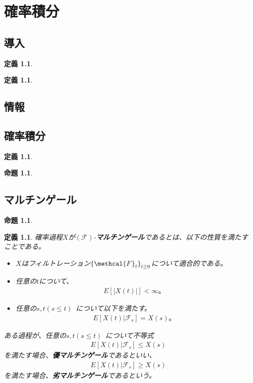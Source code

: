 \documentclass{jsbook}
\theoremstyle{withoutdotendstyle}
\newtheorem{definition}[theorem]{定義}
\newtheorem{proposition}[theorem]{命題}
\numberwithin{theorem}{chapter}%
\begin{document}
\setcounter{chapter}{3}

\chapter{確率積分}
\section{導入}
\begin{definition}

\end{definition}
\begin{definition}

\end{definition}
\section{情報}
\section{確率積分}
\begin{definition}

\end{definition}
\begin{proposition}

\end{proposition}
\section{マルチンゲール}
\begin{proposition}

\end{proposition}
\begin{definition}
  確率過程$X$が$\left(\mathcal{F}\right)$-{\bf マルチンゲール}であるとは、以下の性質を満たすことである。
  \begin{itemize}
    \item $X$はフィルトレーション$\left\{\methcal{F}_{t}\right\}_{t\geq 0}$について適合的である。
    \item 任意の$t$について、
    \begin{align*}
      E\left[\left|X\left(t\right)\right|\right]<\infty\mbox{。}
    \end{align*}
    \item 任意の$s,t\left(s\leq t\right)$ について以下を満たす。
    \begin{align*}
      E\left[\left.X\left(t\right)\right|\mathcal{F}_{s}\right]=X\left(s\right)\mbox{。}
    \end{align*}
  \end{itemize}
  ある過程が、任意の$s,t\left(s\leq t\right)$ について不等式
  \begin{align*}
    E\left[\left.X\left(t\right)\right|\mathcal{F}_{s}\right]\leq X\left(s\right)
  \end{align*}
  を満たす場合、{\bf 優マルチンゲール}であるといい、
  \begin{align*}
    E\left[\left.X\left(t\right)\right|\mathcal{F}_{s}\right]\geq X\left(s\right)
  \end{align*}
  を満たす場合、{\bf 劣マルチンゲール}であるという。
\end{definition}
\end{document}
